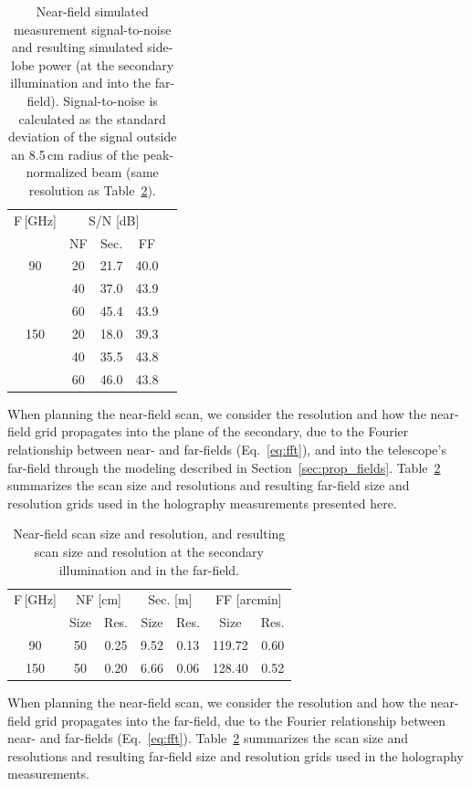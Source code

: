 \begin{table}[ht]
\centering
\begin{tabular}{|c|c|c|c|c|}
\hline
F\,[GHz] & \multicolumn{3}{c|}{S/N [dB]}\\
& NF& Sec.& FF\\
\hline
 90      
         & 20& 21.7 & 40.0 \\
         & 40& 37.0 & 43.9 \\
         & 60& 45.4 & 43.9 \\
 150     
         & 20& 18.0 & 39.3 \\
         & 40& 35.5 & 43.8 \\
         & 60& 46.0 & 43.8 \\
 \hline
\end{tabular}
\caption{Near-field simulated measurement signal-to-noise and resulting simulated side-lobe power (at the secondary illumination and into the far-field).  Signal-to-noise is calculated as the standard deviation of the signal outside an 8.5\,cm radius of the peak-normalized beam (same resolution as Table~\ref{tab:fft_grid}).}
\label{tab:fft_sn}
\end{table}

When planning the near-field scan, we consider the resolution and how the near-field grid propagates into the plane of the secondary, due to the Fourier relationship between near- and far-fields (Eq.~\ref{eq:fft}), and into the telescope's far-field through the modeling described in Section~\ref{sec:prop_fields}. Table~\ref{tab:fft_grid} summarizes the scan size and resolutions and resulting far-field size and resolution grids used in the holography measurements presented here.
\begin{table}[htb]
\centering
\begin{tabular}{|c|c|c|c|c|c|c|}
\hline
F\,[GHz] & \multicolumn{2}{c|}{NF [cm]}&\multicolumn{2}{c|}{Sec. [m]} & \multicolumn{2}{c|}{FF [arcmin]} \\
 & Size & Res. & Size & Res.& Size & Res.\\ \hline
 90 & 50& 0.25 & 9.52& 0.13& 119.72 & 0.60\\
 150 & 50& 0.20 &6.66 &0.06 &128.40&0.52\\
 \hline
\end{tabular}
\caption{Near-field scan size and resolution, and resulting scan size and resolution at the secondary illumination and in the far-field.}
\label{tab:fft_grid}
\end{table}
When planning the near-field scan, we consider the resolution and how the near-field grid propagates into the far-field, due to the Fourier relationship between near- and far-fields (Eq.~\ref{eq:fft}).  Table~\ref{tab:fft_grid} summarizes the scan size and resolutions and resulting far-field size and resolution grids used in the holography measurements.
